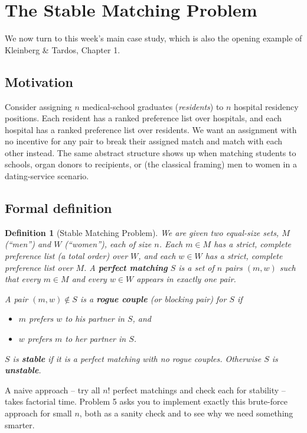 \documentclass[11pt]{article}
\newtheorem{definition}[theorem]{Definition}
\begin{document}
\section{The Stable Matching Problem}

We now turn to this week's main case study, which is also the opening example of
Kleinberg \& Tardos, Chapter 1.

\subsection{Motivation}

Consider assigning $n$ medical-school graduates (\emph{residents}) to $n$ hospital
residency positions. Each resident has a ranked preference list over hospitals, and each
hospital has a ranked preference list over residents. We want an assignment with no
incentive for any pair to break their assigned match and match with each other instead.
The same abstract structure shows up when matching students to schools, organ donors to
recipients, or (the classical framing) men to women in a dating-service scenario.

\subsection{Formal definition}

\begin{definition}[Stable Matching Problem]
We are given two equal-size sets, $M$ (``men'') and $W$ (``women''), each of size $n$.
Each $m \in M$ has a strict, complete preference list (a total order) over $W$, and each
$w \in W$ has a strict, complete preference list over $M$. A \textbf{perfect matching} $S$
is a set of $n$ pairs $(m, w)$ such that every $m \in M$ and every $w \in W$ appears in
exactly one pair.

A pair $(m, w) \notin S$ is a \textbf{rogue couple} (or \emph{blocking pair}) for $S$ if
\begin{itemize}
    \item $m$ prefers $w$ to his partner in $S$, \emph{and}
    \item $w$ prefers $m$ to her partner in $S$.
\end{itemize}
$S$ is \textbf{stable} if it is a perfect matching with no rogue couples. Otherwise $S$ is
\textbf{unstable}.
\end{definition}

A naive approach -- try all $n!$ perfect matchings and check each for stability -- takes
factorial time. Problem 5 asks you to implement exactly this brute-force approach for
small $n$, both as a sanity check and to see why we need something smarter.
\end{document}
